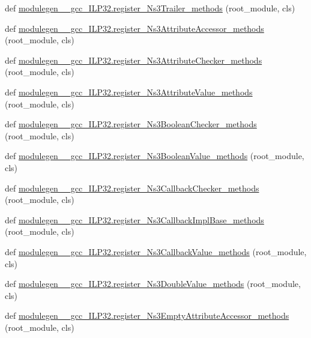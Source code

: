 \begin{DoxyCompactItemize}
\item 
def \hyperlink{namespacemodulegen____gcc__ILP32_a7be1ac5e0e1a8ec544474f384e1642fc}{modulegen\+\_\+\+\_\+gcc\+\_\+\+I\+L\+P32.\+register\+\_\+\+Ns3\+Trailer\+\_\+methods} (root\+\_\+module, cls)
\item 
def \hyperlink{namespacemodulegen____gcc__ILP32_a8f1258b8ab8ec43af174fc3ff9198eb6}{modulegen\+\_\+\+\_\+gcc\+\_\+\+I\+L\+P32.\+register\+\_\+\+Ns3\+Attribute\+Accessor\+\_\+methods} (root\+\_\+module, cls)
\item 
def \hyperlink{namespacemodulegen____gcc__ILP32_a891dd82b08e1260e01670cf52c90138c}{modulegen\+\_\+\+\_\+gcc\+\_\+\+I\+L\+P32.\+register\+\_\+\+Ns3\+Attribute\+Checker\+\_\+methods} (root\+\_\+module, cls)
\item 
def \hyperlink{namespacemodulegen____gcc__ILP32_a7475be8fb4d2d4611c513f6d21c50a32}{modulegen\+\_\+\+\_\+gcc\+\_\+\+I\+L\+P32.\+register\+\_\+\+Ns3\+Attribute\+Value\+\_\+methods} (root\+\_\+module, cls)
\item 
def \hyperlink{namespacemodulegen____gcc__ILP32_ab414168a02828985c68a8c86579fc903}{modulegen\+\_\+\+\_\+gcc\+\_\+\+I\+L\+P32.\+register\+\_\+\+Ns3\+Boolean\+Checker\+\_\+methods} (root\+\_\+module, cls)
\item 
def \hyperlink{namespacemodulegen____gcc__ILP32_a6621c83b18c9ae966428ec3c08728331}{modulegen\+\_\+\+\_\+gcc\+\_\+\+I\+L\+P32.\+register\+\_\+\+Ns3\+Boolean\+Value\+\_\+methods} (root\+\_\+module, cls)
\item 
def \hyperlink{namespacemodulegen____gcc__ILP32_acf2267ead3a407631a6fe495c0560d6b}{modulegen\+\_\+\+\_\+gcc\+\_\+\+I\+L\+P32.\+register\+\_\+\+Ns3\+Callback\+Checker\+\_\+methods} (root\+\_\+module, cls)
\item 
def \hyperlink{namespacemodulegen____gcc__ILP32_a9a85026102c692583453c9b637b8b837}{modulegen\+\_\+\+\_\+gcc\+\_\+\+I\+L\+P32.\+register\+\_\+\+Ns3\+Callback\+Impl\+Base\+\_\+methods} (root\+\_\+module, cls)
\item 
def \hyperlink{namespacemodulegen____gcc__ILP32_a08e2760d3ccd91256fbce9ef63b1e10b}{modulegen\+\_\+\+\_\+gcc\+\_\+\+I\+L\+P32.\+register\+\_\+\+Ns3\+Callback\+Value\+\_\+methods} (root\+\_\+module, cls)
\item 
def \hyperlink{namespacemodulegen____gcc__ILP32_a655ce0a1b19f17b677a9ccff35c632fd}{modulegen\+\_\+\+\_\+gcc\+\_\+\+I\+L\+P32.\+register\+\_\+\+Ns3\+Double\+Value\+\_\+methods} (root\+\_\+module, cls)
\item 
def \hyperlink{namespacemodulegen____gcc__ILP32_a489a942ef59028089c93b9dea61069a3}{modulegen\+\_\+\+\_\+gcc\+\_\+\+I\+L\+P32.\+register\+\_\+\+Ns3\+Empty\+Attribute\+Accessor\+\_\+methods} (root\+\_\+module, cls)

\end{DoxyCompactItemize}
